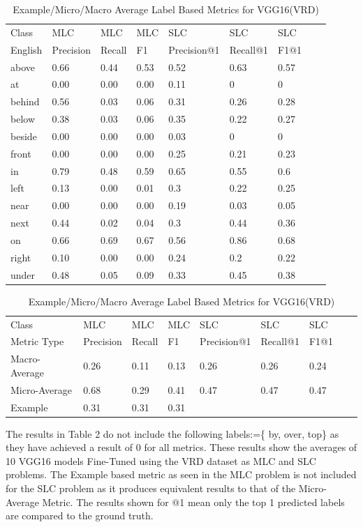 \documentclass{csfyp}
\begin{document}
\begin{table}[!htbp]
\centering
\begin{tabular}{|l|l|l|l|l|l|l|l|l}
\cline{1-7}
Class   &  MLC  &  MLC  &  MLC & SLC &  SLC & SLC \\ \cline{1-7}
English & Precision &  Recall   & F1 & Precision@1 & Recall@1 & F1@1 \\ \cline{1-7}
above	&	0.66	&	0.44	&	0.53	&	0.52	&	0.63	&	0.57 \\ \cline{1-7}
at	    &	0.00	&	0.00	&	0.00	&	0.11	&	0	&	0 \\ \cline{1-7} 
behind	&	0.56	&	0.03	&	0.06	&	0.31	&	0.26	&	0.28 \\ \cline{1-7}
below	&	0.38	&	0.03	&	0.06	&	0.35	&	0.22	&	0.27 \\ \cline{1-7} 
beside	&	0.00	&	0.00	&	0.00	&	0.03	&	0	    &	0 \\ \cline{1-7} 
front	&	0.00	&	0.00	&	0.00	&	0.25	&	0.21	&	0.23 \\ \cline{1-7} 
in	    &	0.79	&	0.48	&	0.59	&	0.65	&	0.55	&	0.6 \\ \cline{1-7} 
left	&	0.13	&	0.00	&	0.01	&	0.3	    &	0.22	&	0.25 \\ \cline{1-7} 
near	&	0.00	&	0.00	&	0.00	&	0.19	&	0.03	&	0.05 \\ \cline{1-7} 
next	&	0.44	&	0.02	&	0.04	&	0.3	    &	0.44	&	0.36 \\ \cline{1-7} 
on	    &	0.66	&	0.69	&	0.67	&	0.56	&	0.86	&	0.68 \\ \cline{1-7} 
right	&	0.10	&	0.00	&	0.00	&	0.24	&	0.2	    &	0.22 \\ \cline{1-7} 
under	&	0.48	&	0.05	&	0.09	&	0.33	&	0.45	&	0.38 \\ \cline{1-7}
\end{tabular}
\caption{VGG16(VRD) results for MLC and SLC}
\centering
\begin{tabular}{|l|l|l|l|l|l|l|l|l}
\cline{1-7}
Class &  MLC  &  MLC  &  MLC & SLC &  SLC & SLC \\ \cline{1-7}
Metric Type  & Precision &  Recall & F1 & Precision@1 & Recall@1 & F1@1 \\ \cline{1-7}
Macro-Average &	0.26	&	0.11	&	0.13	&	0.26	&	0.26	&	0.24 \\ \cline{1-7}
Micro-Average &	0.68	&	0.29	&	0.41	&	0.47	&	0.47	&	0.47 \\ \cline{1-7}
Example       &	0.31	&	0.31	&	0.31  \\ \cline{1-4}
\end{tabular}
\caption{Example/Micro/Macro Average Label Based Metrics for VGG16(VRD)}
The results in Table 2 do not include the following labels:=\{ by, over, top\} as they have achieved a result of 0 for all metrics. These results show the averages of 10 VGG16 models Fine-Tuned using the VRD dataset as MLC and SLC problems. The Example based metric as seen in the MLC problem is not included for the SLC problem as it produces equivalent results to that of the Micro-Average Metric. The results shown for @1 mean only the top 1 predicted labels are compared to the ground truth.
\vspace{-4mm}
\end{table}
\newpage
\end{document}

